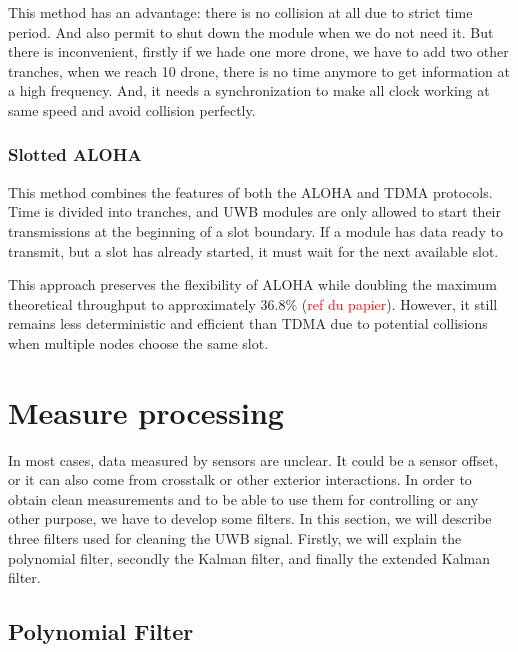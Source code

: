 \noindent This method has an advantage: there is no collision at all due to strict time period. And also permit to shut down the module when we do not need it.
But there is inconvenient, firstly  if we hade one more drone, we have to add two other tranches, when we reach 10 drone, there is no time anymore to get information at a high frequency. And, it needs a synchronization to make all clock working at same speed and avoid collision perfectly.

\subsubsection{Slotted ALOHA}

This method combines the features of both the ALOHA and TDMA protocols. Time is divided into tranches, and UWB modules are only allowed to start their transmissions at the beginning of a slot boundary. If a module has data ready to transmit, but a slot has already started, it must wait for the next available slot.

This approach preserves the flexibility of ALOHA while doubling the maximum theoretical throughput to approximately $36.8\%$ (\textcolor{red}{ref du papier}). However, it still remains less deterministic and efficient than TDMA due to potential collisions when multiple nodes choose the same slot.

\section{Measure processing}
In most cases, data measured by sensors are unclear. It could be a sensor offset, or it can also come from crosstalk or other exterior interactions. In order to obtain clean measurements and to be able to use them for controlling or any other purpose, we have to develop some filters. In this section, we will describe three filters used for cleaning the UWB signal. Firstly, we will explain the polynomial filter, secondly the Kalman filter, and finally the extended Kalman filter.\subsection{Polynomial Filter}

\newpage

